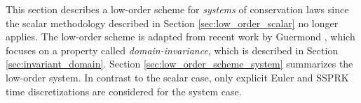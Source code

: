 This section describes a low-order scheme for \emph{systems}
of conservation laws since the scalar methodology described in Section
\ref{sec:low_order_scalar} no longer applies. The low-order
scheme is adapted from recent work by Guermond \cite{guermond_invariantdomain},
which focuses on a property called \emph{domain-invariance},
which is described in Section \ref{sec:invariant_domain}. Section
\ref{sec:low_order_scheme_system} summarizes the low-order system.
In contrast to the scalar case, only explicit Euler and SSPRK time
discretizations are considered for the system case.
